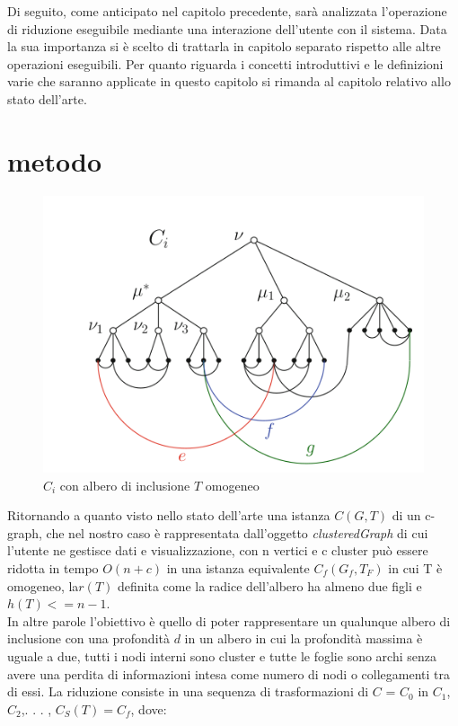 \large{
Di seguito, come anticipato nel capitolo precedente, sarà analizzata l'operazione di riduzione eseguibile mediante una interazione dell'utente con il sistema. Data la sua importanza si è scelto di trattarla in capitolo separato rispetto alle altre operazioni eseguibili. Per quanto riguarda i concetti introduttivi e le definizioni varie che saranno applicate in questo capitolo si rimanda al capitolo relativo allo stato dell'arte.
\section{metodo}
\begin{figure}[!htb]
	\begin{center}
		\includegraphics[width=0.8 \linewidth]{figure/preFlat}
	\end{center}
	\caption{$C_i$ con albero di inclusione $T$ omogeneo \label{fig:preFlat}}
\end{figure}
Ritornando a quanto visto nello stato dell'arte una istanza $C(G,T)$ di un c-graph, che nel nostro caso è rappresentata dall'oggetto \textit{clusteredGraph} di cui l'utente ne gestisce dati e visualizzazione, con n vertici e c cluster può essere ridotta in tempo $O(n+c)$ in una istanza equivalente $C_f(G_f,T_F)$ in cui T è omogeneo, la$r(T)$ definita come la radice dell'albero ha almeno due figli e $h(T)<=n-1$. \\
In altre parole l'obiettivo è quello di poter rappresentare un qualunque albero di inclusione con una profondità $d$ in un albero in cui la profondità massima è uguale a due, tutti i nodi interni sono cluster e tutte le foglie sono archi senza avere una perdita di informazioni intesa come numero di nodi o collegamenti tra di essi. La riduzione consiste in una sequenza di trasformazioni di $C$ = $C_0$ in $C_1$, $C_2$,. . . , $C_S(T) = C_f$, dove:
}
